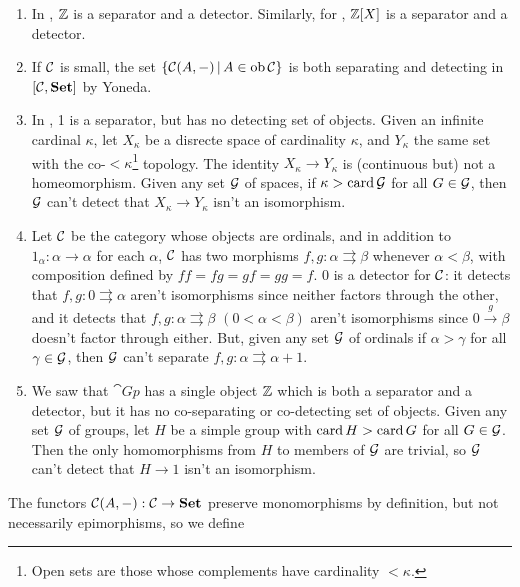 \documentclass{article}
\begin{document}
\begin{exs} \hspace{0.1cm}
    \begin{enumerate}
    \item[(a)] In , $\mathbb{Z}$ is a separator and a detector. Similarly, for , $\mathbb{Z}[X]$ is a separator and a detector.
    \item[(b)] If $\mathcal{C}$ is small, the set $\{\mathcal{C}(A,-) \, | \, A \in \operatorname{ob} \mathcal{C} \} $ is both separating and detecting in $[\mathcal{C},\textbf{Set}]$ by Yoneda.
    \item[(c)] In , 1 is a separator, but  has no detecting set of objects.
    \newlec Given an infinite cardinal $\kappa$, let $X_{\kappa}$ be a disrecte space of cardinality $\kappa$, and $Y_{\kappa}$ the same set with the co-$<\kappa$\footnote{Open sets are those whose complements have cardinality $<\kappa$.} topology. The identity $X_{\kappa} \to Y_{\kappa}$ is (continuous but) not a homeomorphism. Given any set $\mathcal{G}$ of spaces, if $\kappa>\operatorname{card} \mathcal{G}$ for all $G \in \mathcal{G}$, then $\mathcal{G}$ can't detect that $X_{\kappa} \to Y_{\kappa}$ isn't an isomorphism.
    \item[(d)] Let $\mathcal{C}$ be the category whose objects are ordinals, and in addition to $1_{\alpha} : \alpha \to \alpha$ for each $\alpha$, $\mathcal{C}$ has two morphisms $f,g: \alpha \rightrightarrows \beta$ whenever $\alpha < \beta$, with composition defined by $ff=fg=gf=gg=f$. $0$ is a detector for $\mathcal{C}$: it detects that $f,g : 0 \rightrightarrows \alpha$ aren't isomorphisms since neither factors through the other, and it detects that $f,g : \alpha \rightrightarrows \beta$ $(0<\alpha<\beta)$ aren't isomorphisms since $0 \xrightarrow{g} \beta$ doesn't factor through either. But, given any set $\mathcal{G}$ of ordinals if $\alpha > \gamma$ for all $\gamma \in \mathcal{G}$, then $\mathcal{G}$ can't separate $f,g : \alpha \rightrightarrows \alpha+1$.
    \item[(e)] We saw that $\cat{Gp}$ has a single object $\mathbb{Z}$ which is both a separator and a detector, but it has no co-separating or co-detecting set of objects. Given any set $\mathcal{G}$ of groups, let $H$ be a simple group with $\operatorname{card} H > \operatorname{card} G$ for all $G \in \mathcal{G}$. Then the only homomorphisms from $H$ to members of $\mathcal{G}$ are trivial, so $\mathcal{G}$ can't detect that $H \to 1$ isn't an isomorphism.
    \end{enumerate}
\end{exs}
The functors $\mathcal{C}(A, -) : \mathcal{C} \to \textbf{Set}$ preserve monomorphisms by definition, but not necessarily epimorphisms, so we define 
\end{document}

